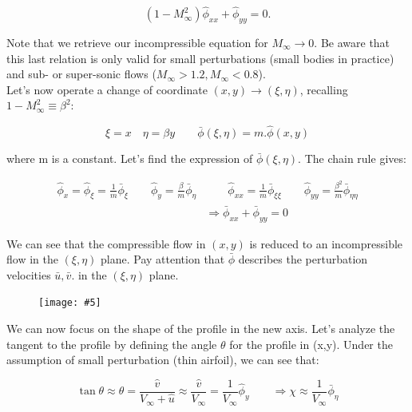 \documentclass[british,french,11pt, a4paper, openany]{article}
\newcommand{\wrapfig}[6]{%
	\begin{figure}%
		\vspace{-5mm}%
		\texttt{[image: \#5]}%
		\captionof{figure}{}%
		\label{#6}%
	\end{figure}%
}
\begin{document}
\begin{equation}
(1-M_\infty ^2) \hat{\phi} _{xx} + \hat{\phi} _{yy} = 0.
\end{equation}

Note that we retrieve our incompressible equation for $M_\infty \rightarrow 0$. Be aware that this last relation is only valid for small perturbations (small bodies in practice) and sub- or super-sonic flows ($M_\infty > 1.2, M_\infty < 0.8$). \\

Let's now operate a change of coordinate $(x,y) \rightarrow (\xi , \eta)$, recalling $1-M_\infty ^2 \equiv \beta ^2$: 

\begin{equation}
\xi = x \quad \eta = \beta y \qquad \bar{\phi} (\xi , \eta) = m .\hat{\phi}(x,y)
\end{equation}

where m is a constant. Let's find the expression of $\bar{\phi} (\xi, \eta)$. The chain rule gives: 

\begin{equation}
\begin{aligned}
\hat{\phi} _x = \hat{\phi}_\xi = \frac{1}{m} \bar{\phi} _\xi \qquad  \hat{\phi} _y = \frac{\beta}{m} \bar{\phi}_\eta &\qquad \hat{\phi} _{xx} = \frac{1}{m} \bar{\phi}_{\xi \xi} \qquad \hat{\phi} _{yy} = \frac{\beta ^2}{m} \bar{\phi}_{\eta \eta}\\
&\Rightarrow \bar{\phi}_{xx} + \bar{\phi}_{yy} = 0
\end{aligned}
\label{eq:6.14}
\end{equation}

We can see that the compressible flow in $(x,y)$ is reduced to an incompressible flow in the $(\xi, \eta)$ plane. Pay attention that $\bar{\phi}$ describes the perturbation velocities $\bar{u}, \bar{v}$. in the $(\xi, \eta)$ plane.  

\wrapfig{7}{l}{7.5}{0.1}{ch6/9}{fig:6.9}
We can now focus on the shape of the profile in the new axis. Let's analyze the tangent to the profile by defining the angle $\theta$ for the profile in (x,y). Under the assumption of small perturbation (thin airfoil), we can see that:

\begin{equation}
\tan \theta \approx \theta = \frac{\hat{v}}{V_\infty + \hat{u}} \approx \frac{\hat{v}}{V_\infty} = \frac{1}{V_\infty} \hat{\phi} _y \qquad \Rightarrow \chi \approx \frac{1}{V_\infty} \bar{\phi} _\eta
\end{equation}
\end{document}
